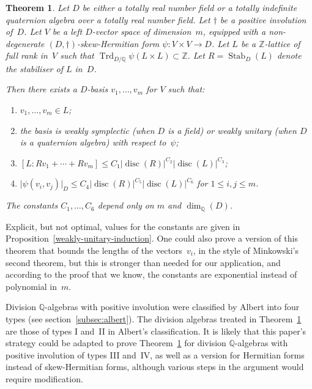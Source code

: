 \documentclass[JEP,XML,SOM,Unicode,NoFloatCountersInSection]{cedram}
\newenvironment{enumeratei}
{\bgroup\def\theenumi{\roman{enumi}}\def\theenumii{\alph{enumii}}\begin{enumerate}}
{\end{enumerate}\egroup}
\newcommand{\bQ}{\mathbb{Q}}
\newcommand{\bZ}{\mathbb{Z}}
\DeclareMathOperator{\disc}{disc}
\DeclareMathOperator{\Stab}{Stab}
\DeclareMathOperator{\Trd}{Trd}
\newcommand{\abs}[1]{\lvert #1 \rvert}
\newtheorem{theorem}[lemma]{Theorem}
\begin{document}
\begin{theorem} \label{minkowski-hermitian-perfect}
Let $D$ be either a totally real number field or a totally indefinite quaternion algebra over a totally real number field.
Let $\dag$ be a positive involution of~$D$.
Let $V$ be a left $D$-vector space of dimension~$m$, equipped with a non-degenerate $(D,\dag)$-skew-Hermitian form $\psi \colon V \times V \to D$.
Let $L$ be a $\bZ$-lattice of full rank in~$V$ such that $\Trd_{D/\bQ} \psi(L \times L) \subset \bZ$.
Let $R=\Stab_D(L)$ denote the stabiliser of $L$ in~$D$.

Then there exists a $D$-basis $v_1, \dotsc, v_m$ for $V$ such that:
\begin{enumeratei}
\item\label{minkowski-hermitian-perfecti} $v_1, \dotsc, v_m \in L$;
\item\label{minkowski-hermitian-perfectii} the basis is weakly symplectic (when $D$ is a field) or weakly unitary (when $D$ is a quaternion algebra) with respect to~$\psi$;
\item\label{minkowski-hermitian-perfectiii} $[L:Rv_1 + \dotsb + Rv_m] \leq C_{1} \abs{\disc(R)}^{C_{2}} \abs{\disc(L)}^{C_{3}}$;
\item\label{minkowski-hermitian-perfectiv} $\abs{\psi(v_i, v_j)}_D \leq C_{4} \abs{\disc(R)}^{C_{5}} \abs{\disc(L)}^{C_{6}}$ for $1 \leq i, j \leq m$.
\end{enumeratei}
The constants $C_{1}, \dotsc, C_{6}$ depend only on $m$ and $\dim_\bQ(D)$.
\end{theorem}

Explicit, but not optimal, values for the constants are given in Proposition~\ref{weakly-unitary-induction}.
One could also prove a version of this theorem that bounds the lengths of the vectors~$v_i$, in the style of Minkowski's second theorem, but this is stronger than needed for our application, and according to the proof that we know, the constants are exponential instead of polynomial in~$m$.

Division $\bQ$-algebras with positive involution were classified by Albert into four types (see section~\ref{subsec:albert}).
The division algebras treated in Theorem~\ref{minkowski-hermitian-perfect} are those of types I and~II in Albert's classification.
It is likely that this paper's strategy could be adapted to prove Theorem~\ref{minkowski-hermitian-perfect} for division $\bQ$-algebras with positive involution of types III and~IV, as well as a version for Hermitian forms instead of skew-Hermitian forms, although various steps in the argument would require modification.
\end{document}
